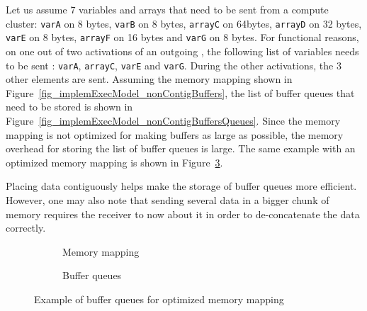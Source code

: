 \documentclass[main.tex]{subfiles}
\begin{document}
\begin{example}
    Let us assume 7 variables and arrays that need to be sent from a compute
    cluster: \verb+varA+ on 8 bytes, \verb+varB+ on 8 bytes, \verb+arrayC+ on
    64bytes, \verb+arrayD+ on 32 bytes, \verb$varE$ on 8 bytes, \verb+arrayF+
    on 16 bytes and \verb+varG+ on 8 bytes. For functional reasons, on one out
    of two activations of an outgoing \PC{}, the following list of variables
    needs to be sent : \verb+varA+, \verb+arrayC+, \verb$varE$ and \verb+varG+.
    During the other \PC{} activations, the 3 other elements are sent. Assuming
    the memory mapping shown in
    Figure~\ref{fig_implemExecModel_nonContigBuffers}, the list of buffer
    queues that need to be stored is shown in
    Figure~\ref{fig_implemExecModel_nonContigBuffersQueues}. Since the memory
    mapping is not optimized for making buffers as large as possible, the
    memory overhead for storing the list of buffer queues is large. The same
    example with an optimized memory mapping is shown in
    Figure~\ref{fig_implemExecModel_exContigBuffers}. 
\end{example}

Placing data contiguously helps make the storage of buffer queues more
efficient. However, one may also note that sending several data in a bigger
chunk of memory requires the receiver to now about it in order to
de-concatenate the data correctly.



\begin{figure}
    \centering
    \begin{subfigure}[b]{0.45\linewidth}
        \centering
        \scalebox{0.7}{}
        \caption{Memory mapping}
        \label{fig_implemExecModel_contigBuffers}
    \end{subfigure}\hspace{6mm}
    \begin{subfigure}[b]{0.45\linewidth}
        \centering
        \scalebox{0.7}{}
        \caption{Buffer queues}
        \label{fig_implemExecModel_contigBuffersQueues}
    \end{subfigure}
    \caption{Example of buffer queues for optimized memory mapping}
    \label{fig_implemExecModel_exContigBuffers}
\end{figure}
\end{document}
